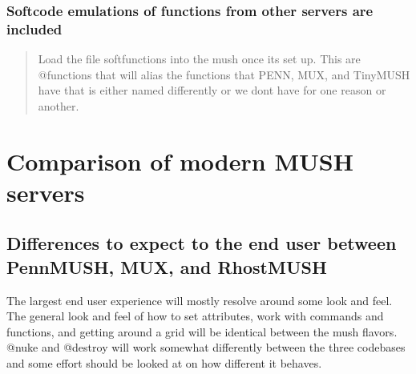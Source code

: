 \documentclass[letterpaper,10pt,english]{sphinxmanual}
\begin{document}
\subsection{Softcode emulations of functions from other servers are included}
\label{\detokenize{features:softcode-emulations-of-functions-from-other-servers-are-included}}\begin{quote}

\sphinxAtStartPar
Load the file softfunctions into the mush once it\textquotesingle{}s set up.  This are
@functions that will alias the functions that PENN, MUX, and TinyMUSH have
that is either named differently or we don\textquotesingle{}t have for one reason or another.
\end{quote}


\chapter{Comparison of modern MUSH servers}
\label{\detokenize{differences:comparison-of-modern-mush-servers}}\label{\detokenize{differences::doc}}

\section{Differences to expect to the end user between PennMUSH, MUX, and RhostMUSH}
\label{\detokenize{differences:differences-to-expect-to-the-end-user-between-pennmush-mux-and-rhostmush}}
\sphinxAtStartPar
The largest end user experience will mostly resolve around some look and feel.
The general look and feel of how to set attributes, work with commands and
functions, and getting around a grid will be identical between the mush flavors.
@nuke and @destroy will work somewhat differently between the three codebases
and some effort should be looked at on how different it behaves.
\end{document}
